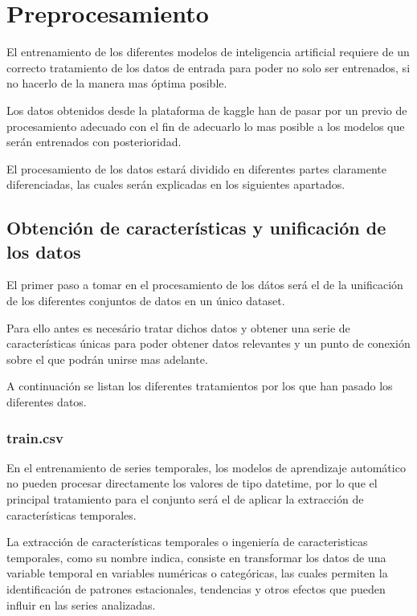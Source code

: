 \documentclass[a4paper,12pt]{article}
\begin{document}
\section{Preprocesamiento}
El entrenamiento de los diferentes modelos 
de inteligencia artificial requiere de un 
correcto tratamiento de los datos de entrada
para poder no solo ser entrenados, si no hacerlo
de la manera mas óptima posible.

Los datos obtenidos desde la plataforma de kaggle
han de pasar por un previo de procesamiento 
adecuado con el fin de adecuarlo lo mas posible
a los modelos que serán entrenados con posterioridad.

El procesamiento de los datos estará dividido en 
diferentes partes claramente diferenciadas, las cuales
serán explicadas en los siguientes apartados.

\subsection{Obtención de características y
unificación de los datos}
El primer paso a tomar en el procesamiento de los
dátos será el de la unificación de los diferentes
conjuntos de datos en un único dataset. 

Para ello antes es necesário tratar dichos datos 
y obtener una serie de características únicas
para poder obtener datos relevantes y un punto de
conexión sobre el que podrán unirse mas adelante.

A continuación se listan los diferentes tratamientos
por los que han pasado los diferentes datos.

\subsubsection{train.csv}
En el entrenamiento de series temporales, los modelos
de aprendizaje automático no pueden procesar directamente
los valores de tipo datetime, por lo que el principal
tratamiento para el conjunto será el de aplicar la 
extracción de características temporales.

La extracción de características temporales o ingeniería de 
caracteristicas temporales, como su nombre indica, 
consiste en transformar los datos de una variable 
temporal en variables numéricas o categóricas, las cuales
permiten la identificación de patrones estacionales, tendencias y 
otros efectos que pueden influir en las series analizadas.
\end{document}
